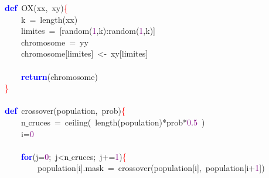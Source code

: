 \noindent
\mbox{}\textbf{\textcolor{Blue}{def}}\ OX\textcolor{BrickRed}{(}xx\textcolor{BrickRed}{,}\ xy\textcolor{BrickRed}{)}\textcolor{Red}{\{} \\
\mbox{}\ \ \ \ k\ \textcolor{BrickRed}{=}\ length\textcolor{BrickRed}{(}xx\textcolor{BrickRed}{)} \\
\mbox{}\ \ \ \ limites\ \textcolor{BrickRed}{=}\ \textcolor{BrickRed}{[}random\textcolor{BrickRed}{(}\textcolor{Purple}{1}\textcolor{BrickRed}{,}k\textcolor{BrickRed}{):}random\textcolor{BrickRed}{(}\textcolor{Purple}{1}\textcolor{BrickRed}{,}k\textcolor{BrickRed}{)]} \\
\mbox{}\ \ \ \ chromosome\ \textcolor{BrickRed}{=}\ yy \\
\mbox{}\ \ \ \ chromosome\textcolor{BrickRed}{[}limites\textcolor{BrickRed}{]}\ \textcolor{BrickRed}{\textless{}-}\ xy\textcolor{BrickRed}{[}limites\textcolor{BrickRed}{]} \\
\mbox{} \\
\mbox{}\ \ \ \ \textbf{\textcolor{Blue}{return}}\textcolor{BrickRed}{(}chromosome\textcolor{BrickRed}{)} \\
\mbox{}\textcolor{Red}{\}} \\
\mbox{} \\
\mbox{}\textbf{\textcolor{Blue}{def}}\ crossover\textcolor{BrickRed}{(}population\textcolor{BrickRed}{,}\ prob\textcolor{BrickRed}{)}\textcolor{Red}{\{} \\
\mbox{}\ \ \ \ n$\_$cruces\ \textcolor{BrickRed}{=}\ ceiling\textcolor{BrickRed}{(}\ length\textcolor{BrickRed}{(}population\textcolor{BrickRed}{)*}prob\textcolor{BrickRed}{*}\textcolor{Purple}{0.5}\ \textcolor{BrickRed}{)} \\
\mbox{}\ \ \ \ i\textcolor{BrickRed}{=}\textcolor{Purple}{0} \\
\mbox{} \\
\mbox{}\ \ \ \ \textbf{\textcolor{Blue}{for}}\textcolor{BrickRed}{(}j\textcolor{BrickRed}{=}\textcolor{Purple}{0}\textcolor{BrickRed}{;}\ j\textcolor{BrickRed}{\textless{}}n$\_$cruces\textcolor{BrickRed}{;}\ j\textcolor{BrickRed}{+=}\textcolor{Purple}{1}\textcolor{BrickRed}{)}\textcolor{Red}{\{} \\
\mbox{}\ \ \ \ \ \ \ \ population\textcolor{BrickRed}{[}i\textcolor{BrickRed}{].}mask\ \textcolor{BrickRed}{=}\ crossover\textcolor{BrickRed}{(}population\textcolor{BrickRed}{[}i\textcolor{BrickRed}{],}\ population\textcolor{BrickRed}{[}i\textcolor{BrickRed}{+}\textcolor{Purple}{1}\textcolor{BrickRed}{])} \\
